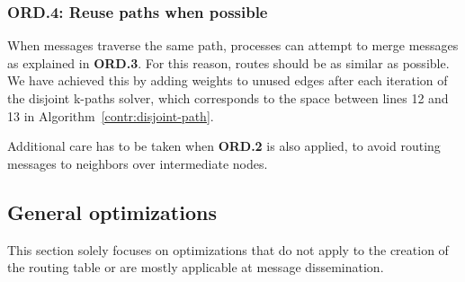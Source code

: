 
\subsubsection{ORD.4: Reuse paths when possible}
When messages traverse the same path, processes can attempt to merge messages as explained in \textbf{ORD.3}. For this reason, routes should be as similar as possible. We have achieved this by adding weights to unused edges after each iteration of the disjoint k-paths solver, which corresponds to the space between lines 12 and 13 in Algorithm~\ref{contr:disjoint-path}. 

Additional care has to be taken when \textbf{ORD.2} is also applied, to avoid routing messages to neighbors over intermediate nodes.

\subsection{General optimizations}
This section solely focuses on optimizations that do not apply to the creation of the routing table or are mostly applicable at message dissemination.

